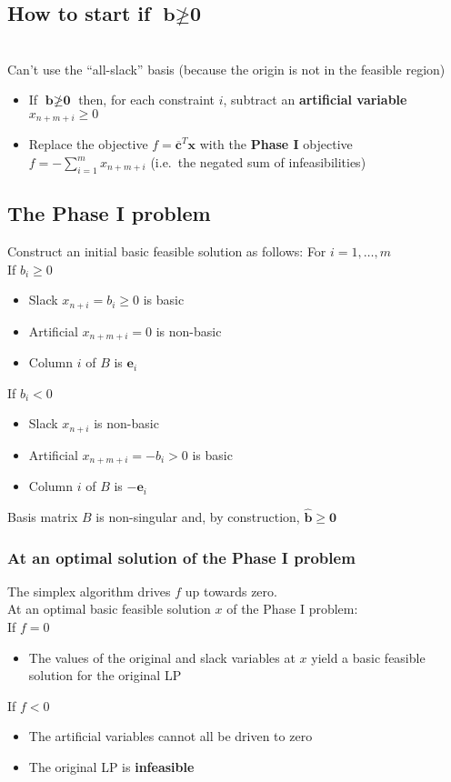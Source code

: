 \documentclass[11pt,a4paper]{article}
\begin{document}
\subsection*{How to start if $\textbf{b} \ngeq \textbf{0}$}\\
Can't use the ``all-slack'' basis (because the origin is not in the feasible region)
\begin{itemize}
	\item If $\textbf{b} \ngeq \textbf{0}$ then, for each constraint $i$, subtract an \textbf{artificial variable} $x_{n+m+i} \geq 0$
	\item Replace the objective $f = \overline{\textbf{c}}^T\textbf{x}$ with the \textbf{Phase I} objective $f = - \sum^m_{i=1} x_{n+m+i}$ (i.e.\ the negated sum of infeasibilities)
	\end{itemize}
\subsection*{The Phase I problem}
Construct an initial basic feasible solution as follows: For $i = 1, \ldots, m$\\
If $b_i \geq 0$
\begin{itemize}
    \item Slack $x_{n+i} = b_i \geq 0$ is basic
    \item Artificial $x_{n+m+i} = 0$ is non-basic
    \item Column $i$ of $B$ is $\textbf{e}_i$
\end{itemize}
If $b_i < 0$
\begin{itemize}
    \item Slack $x_{n+i}$ is non-basic
    \item Artificial $x_{n+m+i} = -b_i > 0$ is basic
    \item Column $i$ of $B$ is $-\textbf{e}_i$
\end{itemize}
Basis matrix $B$ is non-singular and, by construction, $\widehat{\textbf{b}} \geq \textbf{0}$
\subsubsection*{At an optimal solution of the Phase I problem}
The simplex algorithm drives $f$ up towards zero.\\
At an optimal basic feasible solution $x$ of the Phase I problem:\\
If $f=0$ 
\begin{itemize}
	\item The values of the original and slack variables at $x$ yield a basic feasible solution for the original LP
\end{itemize}
If $f<0$ 
\begin{itemize}
	\item The artificial variables cannot all be driven to zero
	\item The original LP is \textbf{infeasible}
\end{itemize}
\end{document}
